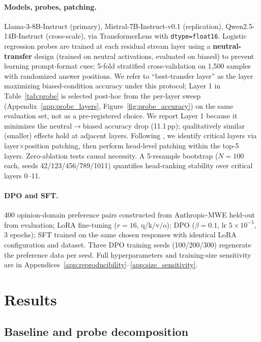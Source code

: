 \documentclass{article}
\begin{document}
\paragraph{Models, probes, patching.} Llama-3-8B-Instruct (primary), Mistral-7B-Instruct-v0.1 (replication), Qwen2.5-14B-Instruct (cross-scale), via TransformerLens with \texttt{dtype=float16}. Logistic regression probes are trained at each residual stream layer using a \textbf{neutral-transfer} design (trained on neutral activations, evaluated on biased) to prevent learning prompt-format cues; 5-fold stratified cross-validation on 1{,}500 samples with randomized answer positions. We refer to ``best-transfer layer'' as the layer maximizing biased-condition accuracy under this protocol; Layer 1 in Table~\ref{tab:probe} is selected post-hoc from the per-layer sweep (Appendix~\ref{app:probe_layers}, Figure~\ref{fig:probe_accuracy}) on the same evaluation set, not as a pre-registered choice. We report Layer 1 because it minimizes the neutral$\to$biased accuracy drop (11.1\,pp); qualitatively similar (smaller) effects hold at adjacent layers. Following \citet{wang2022interpretability}, we identify critical layers via layer$\times$position patching, then perform head-level patching within the top-5 layers. Zero-ablation tests causal necessity. A 5-resample bootstrap ($N{=}100$ each, seeds 42/123/456/789/1011) quantifies head-ranking stability over critical layers 0--11.

\paragraph{DPO and SFT.} 400 opinion-domain preference pairs constructed from Anthropic-MWE held-out from evaluation; LoRA fine-tuning ($r{=}16$, q/k/v/o); DPO ($\beta{=}0.1$, lr $5{\times}10^{-5}$, 3 epochs); SFT trained on the same chosen responses with identical LoRA configuration and dataset. Three DPO training seeds (100/200/300) regenerate the preference data per seed. Full hyperparameters and training-size sensitivity are in Appendices~\ref{app:reproducibility}--\ref{app:size_sensitivity}.

\section{Results}
\label{sec:results}

\subsection{Baseline and probe decomposition}
\label{sec:probes}
\end{document}
